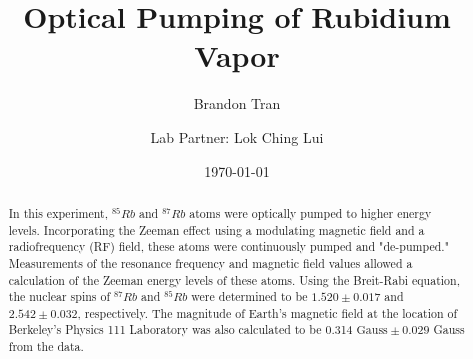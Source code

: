 \documentclass[%
 aip,
rsi,%
 amsmath,amssymb,
 reprint,%
author-numerical,%
]{revtex4-1}
\begin{document}

\title[Physics 111B - Optical Pumping (OPT) Lab]{Optical Pumping of Rubidium Vapor}


\author{Brandon Tran}
\author{Lab Partner: Lok Ching Lui}%
%


\date{\today}

\begin{abstract}

In this experiment, $^{85}Rb$ and $^{87}Rb$ atoms were optically pumped to higher energy levels. Incorporating the Zeeman effect using a modulating magnetic field and a radiofrequency (RF) field, these atoms were continuously pumped and "de-pumped." Measurements of the resonance frequency and magnetic field values allowed a calculation of the Zeeman energy levels of these atoms. Using the Breit-Rabi equation, the nuclear spins of $^{87}Rb$ and $^{85}Rb$ were determined to be $1.520\pm0.017$ and $2.542\pm0.032$, respectively. The magnitude of Earth's magnetic field at the location of Berkeley's Physics 111 Laboratory was also calculated to be 0.314 $\text{Gauss}\pm0.029$ Gauss from the data.

\end{abstract} 


\maketitle
\end{document}
